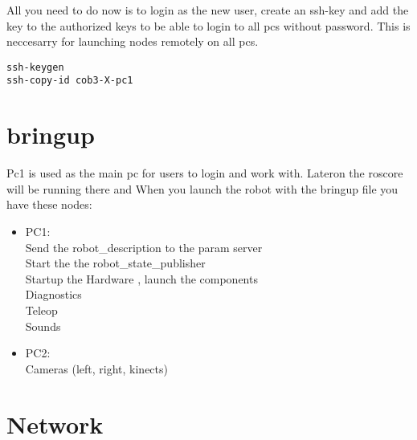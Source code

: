 All you need to do now is to login as the new user, create an ssh-key and add the key to the authorized keys to be able to login to all pcs without password. This is neccesarry for launching nodes remotely on all pcs.
\begin{lstlisting}
ssh-keygen
ssh-copy-id cob3-X-pc1
\end{lstlisting}


\section{bringup}
Pc1 is used as the main pc for users to login and work with. Lateron the roscore will be running there and 
When you launch the robot with the bringup file you have these nodes:
\begin{itemize}
\item PC1:
\\ Send the robot\_description to the param server
\\ Start the the robot\_state\_publisher
\\Startup the Hardware , launch the components
\\ Diagnostics
\\ Teleop
\\ Sounds
 \item PC2:
\\ Cameras (left, right, kinects)
\end{itemize}


\section{Network} 

